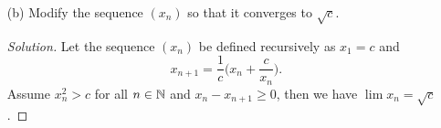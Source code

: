 \begin{enumerate}
\begin{proof}
\begin{align*}
                        &= 0. 
        \end{align*}
        Furthermore, when \( x^2 = 2 \) we get that \( x_n - x_{n+1} = 0 \). Hence, we have \( x_n - x_{n+1} \geq 0\) for all \( n \in \N \). By the Monotone Convergence Theorem, we get that \( (x_n)\) is a convergent sequence. Since \( \lim x_n = \lim x_{n+1}  \), we can show that \( \lim x_n = \sqrt{2}\). By the Algebraic Limit Theorem, we have 
        \begin{align*}
            x = \lim x_{n+1} &= \lim \Big( \frac{1}{2} \Big( x_n + \frac{2}{x_n}\Big)\Big)  \\ 
                            &= \frac{1}{2} \lim \Big( x_n + \frac{2}{x_n}\Big) \\ 
                            &= \frac{1}{2} \Big( \lim x_n + \lim  \frac{2}{x_n}  \Big) \\
                            &= \frac{1}{2} \Big(x + \frac{2}{x}\Big) \\
                            &= \frac{1}{2}x + \frac{1}{x} \\
                            &= \frac{x^2 + 2}{2x} \\
        \end{align*}
        which implies that 
        \begin{align*}
        x^2 &= 2 \\ 
        \implies x &= \sqrt{2}.
        \end{align*}
        Hence, we have \( \lim x_n = \sqrt{2} \)
    \end{proof} 
    \item[(b)] Modify the sequence \( (x_n)\) so that it converges to \( \sqrt{c}\).
        \begin{proof}[Solution]
         Let the sequence \( (x_n)\) be defined recursively as \( x_1  =c \) and 
        \[
            x_{n+1} = \frac{1}{c} \Big( x_n + \frac{c}{x_n}\Big). 
        \] 
        Assume \( x_n^2 > c \) for all \( n \in \N \) and \( x_n - x_{n+1} \geq 0\), then we have \( \lim x_n = \sqrt{c} \).
        \end{proof}
        
\end{enumerate}




































